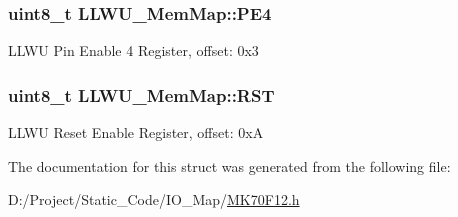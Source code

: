 \subsubsection[{P\+E4}]{\setlength{\rightskip}{0pt plus 5cm}uint8\+\_\+t L\+L\+W\+U\+\_\+\+Mem\+Map\+::\+P\+E4}\label{struct_l_l_w_u___mem_map_a61ec3534039e161c5c71ea7f290f23d5}
L\+L\+W\+U Pin Enable 4 Register, offset\+: 0x3 \hypertarget{struct_l_l_w_u___mem_map_a95c7e36f114e8ac7f235ad8ef335f1cf}{}
\subsubsection[{R\+S\+T}]{\setlength{\rightskip}{0pt plus 5cm}uint8\+\_\+t L\+L\+W\+U\+\_\+\+Mem\+Map\+::\+R\+S\+T}\label{struct_l_l_w_u___mem_map_a95c7e36f114e8ac7f235ad8ef335f1cf}
L\+L\+W\+U Reset Enable Register, offset\+: 0x\+A 

The documentation for this struct was generated from the following file\+:\begin{DoxyCompactItemize}
\item 
D\+:/\+Project/\+Static\+\_\+\+Code/\+I\+O\+\_\+\+Map/\hyperlink{_m_k70_f12_8h}{M\+K70\+F12.\+h}\end{DoxyCompactItemize}
